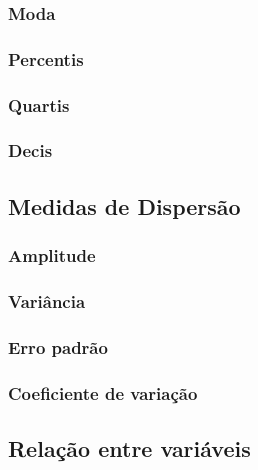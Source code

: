 \documentclass[
  letterpaper,
  DIV=11,
  numbers=noendperiod]{scrreprt}
\begin{document}
\hypertarget{moda}{%
\subsubsection{Moda}\label{moda}}

\hypertarget{percentis}{%
\subsubsection{Percentis}\label{percentis}}

\hypertarget{quartis}{%
\subsubsection{Quartis}\label{quartis}}

\hypertarget{decis}{%
\subsubsection{Decis}\label{decis}}

\hypertarget{medidas-de-dispersuxe3o}{%
\subsection{Medidas de Dispersão}\label{medidas-de-dispersuxe3o}}

\hypertarget{amplitude}{%
\subsubsection{Amplitude}\label{amplitude}}

\hypertarget{variuxe2ncia}{%
\subsubsection{Variância}\label{variuxe2ncia}}

\hypertarget{erro-padruxe3o}{%
\subsubsection{Erro padrão}\label{erro-padruxe3o}}

\hypertarget{coeficiente-de-variauxe7uxe3o}{%
\subsubsection{Coeficiente de
variação}\label{coeficiente-de-variauxe7uxe3o}}

\hypertarget{relauxe7uxe3o-entre-variuxe1veis}{%
\subsection{Relação entre
variáveis}\label{relauxe7uxe3o-entre-variuxe1veis}}
\end{document}
